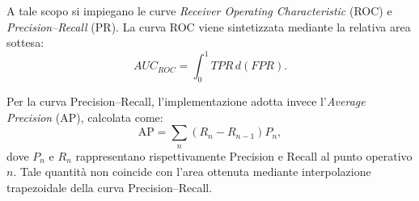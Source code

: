 A tale scopo si impiegano le curve \textit{Receiver Operating Characteristic} (ROC) e \textit{Precision--Recall} (PR). La curva ROC viene sintetizzata mediante la relativa area sottesa:
\begin{equation}
    AUC_{ROC}=\int_{0}^{1}TPR\,d(FPR).
\end{equation}

Per la curva Precision--Recall, l'implementazione adotta invece l'\textit{Average Precision} (AP), calcolata come:
\begin{equation}
    \mathrm{AP}=\sum_n (R_n-R_{n-1})P_n,
    \label{eq:average_precision}
\end{equation}
dove $P_n$ e $R_n$ rappresentano rispettivamente Precision e Recall al punto operativo $n$. Tale quantità non coincide con l'area ottenuta mediante interpolazione trapezoidale della curva Precision--Recall.

